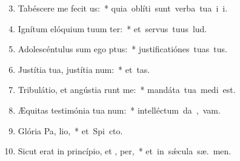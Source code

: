 \begin{flushleft}
\begin{enumerate}[leftmargin=*]
\setcounter{enumi}{2}


\item Tabéscere me fecit  us:~* \mbox{quia oblíti sunt verba tua i i.}
\item Ignítum elóquium tuum ter:~* \mbox{et servus tuus  lud.}
\item Adolescéntulus sum ego  ptus:~* \mbox{justificatiónes tuas   tus.}
\item Justítia tua, justítia  num:~* \mbox{et   tas.}
\item Tribulátio, et angústia runt me:~* \mbox{mandáta tua medi  est.}
\item Æquitas testimónia tua  num:~* \mbox{intelléctum da ,  vam.}
\item Glória Pa,  lio,~* \mbox{et Spi cto.}
\item Sicut erat in princípio, et ,  per,~* \mbox{et in s\'{\ae}cula sæ. men.}



\end{enumerate}
\end{flushleft}

